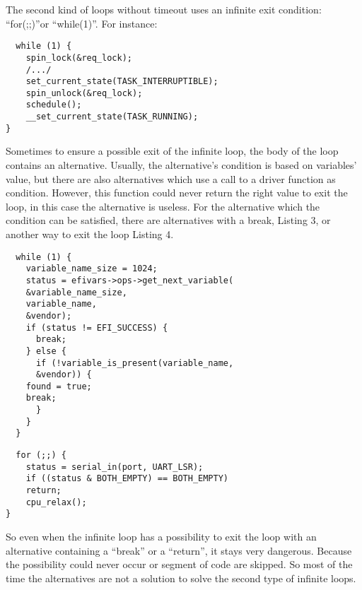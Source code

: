\documentclass[a4paper,12pt]{article}
\begin{document}
\vspace{0.5cm}
The second kind of loops without timeout uses an infinite exit condition: ``for(;;)''or ``while(1)''. For instance:
\begin{lstlisting}
  while (1) {
    spin_lock(&req_lock);
    /.../
    set_current_state(TASK_INTERRUPTIBLE);
    spin_unlock(&req_lock);
    schedule();
    __set_current_state(TASK_RUNNING);
}
\end{lstlisting}

Sometimes to ensure a possible exit of the infinite loop, the body of the loop contains an alternative. Usually, the alternative's condition is based on variables' value, but there are also alternatives which use a call to a driver function as condition. However, this function could never return the right value to exit the loop, in this case the alternative is useless. For the alternative which the condition can be satisfied, there are alternatives with a break, Listing 3, or another way to exit the loop Listing 4. 
\begin{lstlisting}
  while (1) {
    variable_name_size = 1024;
    status = efivars->ops->get_next_variable(
    &variable_name_size,
    variable_name,
    &vendor);
    if (status != EFI_SUCCESS) {
      break;
    } else {
      if (!variable_is_present(variable_name,
      &vendor)) {
	found = true;
	break;
      }
    }
  }
\end{lstlisting}

\begin{lstlisting}
  for (;;) {
    status = serial_in(port, UART_LSR);
    if ((status & BOTH_EMPTY) == BOTH_EMPTY)
    return;
    cpu_relax();
}
\end{lstlisting}
\vspace{0.5cm}
So even when the infinite loop has a possibility to exit the loop with an alternative containing a ``break'' or a ``return'', it stays very dangerous. Because the possibility could never occur or segment of code are skipped. 
So most of the time the alternatives are not a solution to solve the second type of infinite loops.
\end{document}
